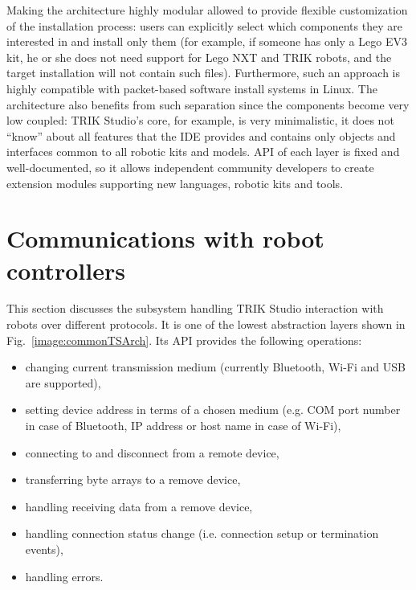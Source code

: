 \documentclass[conference]{IEEEtran}
\begin{document}
Making the architecture highly modular allowed to provide flexible customization of the installation process: users can explicitly select which components they are interested in and install only them (for example, if someone has only a Lego EV3 kit, he or she does not need support for Lego NXT and TRIK robots, and the target installation will not contain such files). Furthermore, such an approach is highly compatible with packet-based software install systems in Linux. The architecture also benefits from such separation since the components become very low coupled: TRIK Studio's core, for example, is very minimalistic, it does not ``know'' about all features that the IDE provides and contains only objects and interfaces common to all robotic kits and models. API of each layer is fixed and well-documented, so it allows independent community developers to create extension modules supporting new languages, robotic kits and tools.

\section{Communications with robot controllers}
\label{chapter:communications}

This section discusses the subsystem handling TRIK Studio interaction with robots over different protocols. It is one of the lowest abstraction layers shown in Fig.~\ref{image:commonTSArch}. Its API provides the following operations: 

\begin{itemize}
    \item changing current transmission medium (currently Bluetooth, Wi-Fi and USB are supported),
    \item setting device address in terms of a chosen medium (e.g. COM port number in case of Bluetooth, IP address or host name in case of Wi-Fi),
    \item connecting to and disconnect from a remote device,
    \item transferring byte arrays to a remove device,
    \item handling receiving data from a remove device,
    \item handling connection status change (i.e. connection setup or termination events),
    \item handling errors.
\end{itemize}
\end{document}
